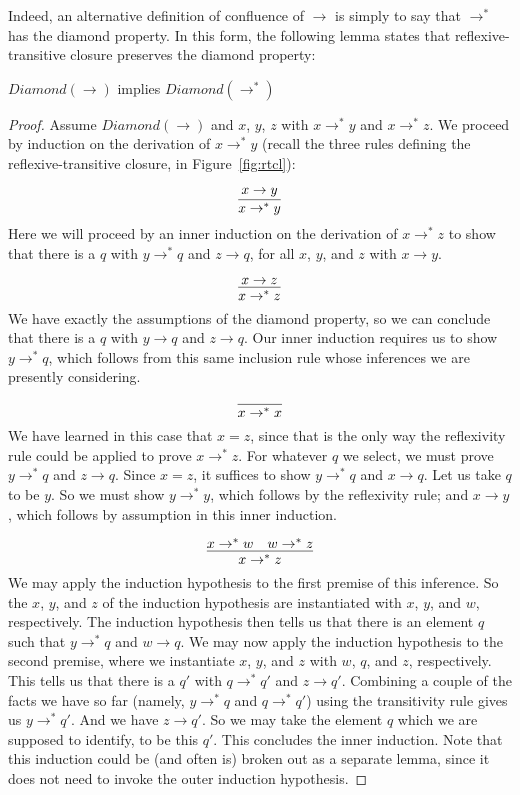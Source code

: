 Indeed, an alternative definition of confluence of $\to$ is simply to say that $\to^*$ has the diamond property.
In this form, the following lemma states that reflexive-transitive closure preserves the diamond property:
\begin{theorem}
\label{thm:stardia}
  $\textit{Diamond}(\to)$ implies $\textit{Diamond}(\to^*)$
\end{theorem}
\begin{proof}
  Assume $\textit{Diamond}(\to)$ and $x$, $y$, $z$ with $x \to^*y$ and $x \to^* z$.  We proceed
  by induction on the derivation of $x \to^* y$ (recall the three rules defining the reflexive-transitive
  closure, in Figure~\ref{fig:rtcl}):

  \case{ }
  \[
  \infer{x \to^* y}{x \to y}
  \]
  \noindent Here we will proceed by an inner induction on the derivation of $x \to^* z$ to show that there
  is a $q$ with $y\to^*q$ and $z \to q$, for all $x$, $y$, and $z$ with $x\to y$.

  \[
  \infer{x \to^* z}{x \to z}
  \]
  \noindent We have exactly the assumptions of the diamond property, so we can conclude that there is a $q$
  with $y \to q$ and $z \to q$.  Our inner induction requires us to show $y \to^* q$, which follows from
  this same inclusion rule whose inferences we are presently considering.

  \[
  \infer{x \to^* x}{\ }
  \]
  \noindent We have learned in this case that $x = z$, since that is the only way the reflexivity
  rule could be applied to prove $x \to^*z$.  
  For whatever $q$ we select, we must prove $y \to^*q$ and $z \to q$.  
  Since $x = z$, it suffices to show $y \to^*q$ and $x \to q$.  Let us take $q$ to be $y$.
  So we must show $y \to^* y$, which follows by the reflexivity rule; and $x \to y$, which
  follows by assumption in this inner induction.

  \[
  \infer{x \to^* z}{x \to^*w & w \to^* z}
  \]
  \noindent We may apply the induction hypothesis to the first premise of this
  inference.  So the $x$, $y$, and $z$ of the induction hypothesis are instantiated
  with $x$, $y$, and $w$, respectively.  The induction hypothesis then tells us that
  there is an element $q$ such that $y \to^*q$ and $w \to q$.  We may now apply the
  induction hypothesis to the second premise, where we
  instantiate $x$, $y$, and $z$ with $w$, $q$, and $z$, respectively.  This tells
  us that there is a $q'$ with $q\to^*q'$ and $z \to q'$.  Combining a couple of
  the facts we have so far (namely, $y\to^* q$ and $q\to^* q'$) using the
  transitivity rule gives us $y \to^* q'$.  And we have $z \to q'$.
  So we may take the element $q$ which we are supposed to identify, to be this $q'$.
  This concludes the inner induction.  Note that this induction could be (and often is)
  broken out as a separate lemma, since it does not need to invoke the outer induction
  hypothesis.
  

\end{proof}
